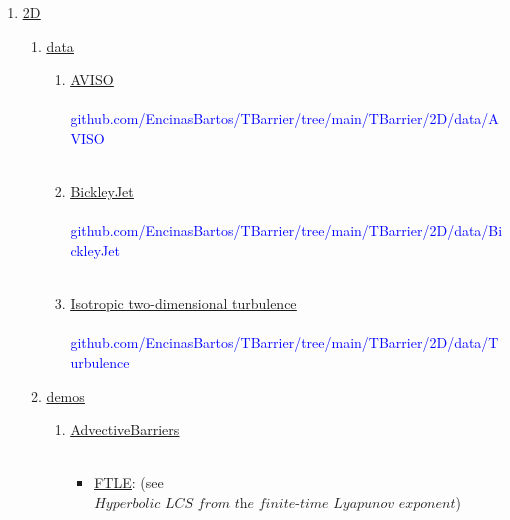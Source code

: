\documentclass{article}
\begin{document}
\begin{enumerate}
\item  \href{https://github.com/EncinasBartos/TBarrier/tree/main/TBarrier/2D}{\underline{2D}}
\begin{enumerate}
\item \href{https://github.com/EncinasBartos/TBarrier/tree/main/TBarrier/2D/data}{\underline{data}}
\begin{enumerate}
\item \href{https://github.com/EncinasBartos/TBarrier/tree/main/TBarrier/2D/data/AVISO}{\underline{AVISO}} \\ \\
\textcolor{blue}{{\footnotesize github.com/EncinasBartos/TBarrier/tree/main/TBarrier/2D/data/AVISO}} \\ \\
\item \href{https://github.com/EncinasBartos/TBarrier/tree/main/TBarrier/2D/data/BickleyJet}{\underline{BickleyJet}} \\ \\
\textcolor{blue}{{\footnotesize github.com/EncinasBartos/TBarrier/tree/main/TBarrier/2D/data/BickleyJet}} \\ \\
\item \href{https://github.com/EncinasBartos/TBarrier/tree/main/TBarrier/2D/data/Turbulence}{\underline{Isotropic two-dimensional turbulence}} \\ \\
\textcolor{blue}{{\footnotesize github.com/EncinasBartos/TBarrier/tree/main/TBarrier/2D/data/Turbulence}}
\end{enumerate}
\item \href{https://github.com/EncinasBartos/TBarrier/tree/main/TBarrier/2D/demos}{\underline{demos}} \\ 
\begin{enumerate}
\item \href{https://github.com/EncinasBartos/TBarrier/tree/main/TBarrier/2D/demos/AdvectiveBarriers}{\underline{AdvectiveBarriers}} \\ \\
\begin{itemize}
\item \href{https://github.com/EncinasBartos/TBarrier/tree/main/TBarrier/2D/demos/AdvectiveBarriers/FTLE}{\underline{FTLE}}: (see $ \textit{Hyperbolic LCS from the finite-time Lyapunov exponent} $) \\ \\

\end{itemize}
\end{enumerate}
\end{enumerate}
\end{enumerate}
\end{document}
